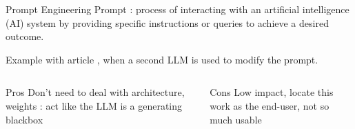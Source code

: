 \begin{frame}{Prompt Engineering}
    Prompt : process of interacting with an artificial intelligence (AI) system by providing specific instructions or queries to achieve a desired outcome. 

    Example with article \cite{guo_connecting_2024}, when a second LLM is used to modify the prompt.

    \begin{columns}
        
        \begin{column}[t]{0.45\textwidth}
            \begin{block}{Pros}
                Don't need to deal with architecture, weights : 
                act like the LLM is a generating blackbox
                
            \end{block}

        \end{column}

        \begin{column}[t]{0.45\textwidth}
            \begin{block}{Cons}
                Low impact, locate this work as the end-user, not so much usable
                
            \end{block}

        \end{column}

    \end{columns}

    
\end{frame}

